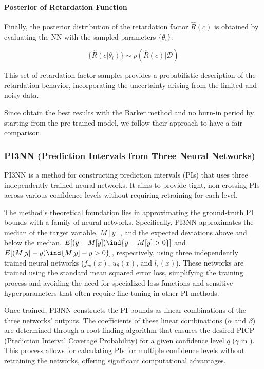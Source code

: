 \paragraph{Posterior of Retardation Function}

Finally, the posterior distribution of the retardation factor $\hat{R}(c)$ is obtained by evaluating the NN with the sampled parameters $\{\theta_i\}$:

\begin{equation*}
\{\hat{R}(c | \theta_i)\} \sim p(\hat{R}(c) | \mathcal{D})
\end{equation*}

This set of retardation factor samples provides a probabilistic description of the retardation behavior, incorporating the uncertainty arising from the limited and noisy data.

Since \cite{finn} obtain the best results with the Barker method and no burn-in period by starting from the pre-trained model, we follow their approach to have a fair comparison.




\subsubsection{PI3NN (Prediction Intervals from Three Neural Networks)}
PI3NN \cite{pi3nn} is a method for constructing prediction intervals (PIs) that uses three independently trained neural networks. It aims to provide tight, non-crossing PIs across various confidence levels without requiring retraining for each level.

The method's theoretical foundation lies in approximating the ground-truth PI bounds with a family of neural networks. Specifically, PI3NN approximates the median of the target variable, $M[y]$, and the expected deviations above and below the median, $E[(y - M[y]) \ind{y-M[y]>0}]$ and $E[(M[y] - y) \ind{M[y]-y>0}]$, respectively, using three independently trained neural networks ($f_w(x)$, $u_\theta(x)$, and $l_\epsilon(x)$). These networks are trained using the standard mean squared error loss, simplifying the training process and avoiding the need for specialized loss functions and sensitive hyperparameters that often require fine-tuning in other PI methods.

Once trained, PI3NN constructs the PI bounds as linear combinations of the three networks' outputs. The coefficients of these linear combinations ($\alpha$ and $\beta$) are determined through a root-finding algorithm that ensures the desired PICP (Prediction Interval Coverage Probability) for a given confidence level $q$ ($\gamma$ in \cite{pi3nn}). This process allows for calculating PIs for multiple confidence levels without retraining the networks, offering significant computational advantages.


